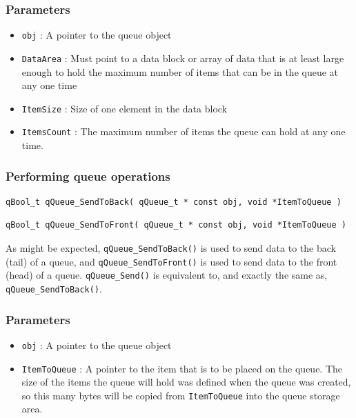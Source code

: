 \documentclass{article}
\begin{document}
\subsubsection*{Parameters}
\begin{itemize}
    \item \lstinline{obj} : A pointer to the queue object
    \item \lstinline{DataArea} : Must point to a data block or array of data that is at least large enough to hold the maximum number of items that can be in the queue at any one time
    \item \lstinline{ItemSize} : Size of one element in the data block
    \item \lstinline{ItemsCount} : The maximum number of items the queue can hold at any one time.
\end{itemize}      
    
\noindent\hrulefill    
    
\subsubsection{Performing queue operations}
\begin{lstlisting}[style=CStyle]
qBool_t qQueue_SendToBack( qQueue_t * const obj, void *ItemToQueue )
\end{lstlisting}

\begin{lstlisting}[style=CStyle]
qBool_t qQueue_SendToFront( qQueue_t * const obj, void *ItemToQueue )
\end{lstlisting}

As might be expected, \lstinline{qQueue_SendToBack()} is used to send data to the back (tail) of a queue, and \lstinline{qQueue_SendToFront()} is used to send data to the front (head) of a queue. \lstinline{qQueue_Send()}  is equivalent to, and exactly the same as, \lstinline{qQueue_SendToBack()}.

\subsubsection*{Parameters}
\begin{itemize}
    \item \lstinline{obj} : A pointer to the queue object
    \item \lstinline{ItemToQueue} : A pointer to the item that is to be placed on the queue. The size of the items the queue will hold was defined when the queue was created, so this many bytes will be copied from \lstinline{ItemToQueue} into the queue storage area. 
\end{itemize}  
\end{document}
